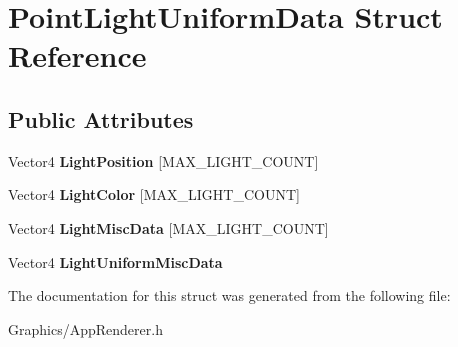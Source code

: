 \hypertarget{structPointLightUniformData}{}\section{Point\+Light\+Uniform\+Data Struct Reference}
\label{structPointLightUniformData}
\subsection*{Public Attributes}
\begin{DoxyCompactItemize}
\item 
\mbox{\label{structPointLightUniformData_a17da3954b568253332a65c5de5955aa5}} 
Vector4 {\bfseries Light\+Position} \mbox{[}M\+A\+X\+\_\+\+L\+I\+G\+H\+T\+\_\+\+C\+O\+U\+NT\mbox{]}
\item 
\mbox{\label{structPointLightUniformData_af98c24ec1d879d1180e1d49feb6c8151}} 
Vector4 {\bfseries Light\+Color} \mbox{[}M\+A\+X\+\_\+\+L\+I\+G\+H\+T\+\_\+\+C\+O\+U\+NT\mbox{]}
\item 
\mbox{\label{structPointLightUniformData_a4c926e8ce4239973eccc1217ff6c7396}} 
Vector4 {\bfseries Light\+Misc\+Data} \mbox{[}M\+A\+X\+\_\+\+L\+I\+G\+H\+T\+\_\+\+C\+O\+U\+NT\mbox{]}
\item 
\mbox{\label{structPointLightUniformData_a88007eb86d151be63b9874c55e7bcb4d}} 
Vector4 {\bfseries Light\+Uniform\+Misc\+Data}
\end{DoxyCompactItemize}


The documentation for this struct was generated from the following file\+:\begin{DoxyCompactItemize}
\item 
Graphics/App\+Renderer.\+h\end{DoxyCompactItemize}
